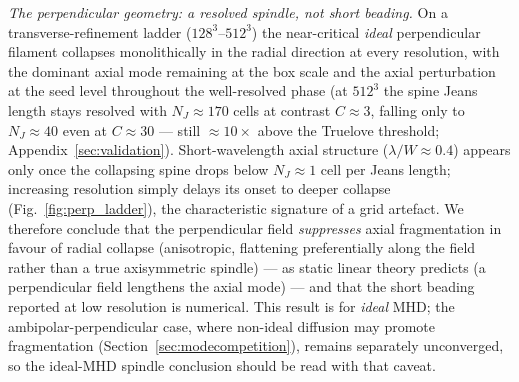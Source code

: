 \documentclass[usenatbib,twoside,twocolumn]{mnras}
\begin{document}
\emph{The perpendicular geometry: a resolved spindle, not short beading.} On a transverse-refinement ladder ($128^3$--$512^3$) the near-critical \emph{ideal} perpendicular filament collapses monolithically in the radial direction at every resolution, with the dominant axial mode remaining at the box scale and the axial perturbation at the seed level throughout the well-resolved phase (at $512^3$ the spine Jeans length stays resolved with $N_J\approx170$ cells at contrast $C\approx3$, falling only to $N_J\approx40$ even at $C\approx30$ --- still $\approx10\times$ above the Truelove threshold; Appendix~\ref{sec:validation}). Short-wavelength axial structure ($\lambda/W\approx0.4$) appears only once the collapsing spine drops below $N_J\approx1$ cell per Jeans length; increasing resolution simply delays its onset to deeper collapse (Fig.~\ref{fig:perp_ladder}), the characteristic signature of a grid artefact. We therefore conclude that the perpendicular field \emph{suppresses} axial fragmentation in favour of radial collapse (anisotropic, flattening preferentially along the field rather than a true axisymmetric spindle) --- as static linear theory predicts (a perpendicular field lengthens the axial mode) --- and that the short beading reported at low resolution is numerical. This result is for \emph{ideal} MHD; the ambipolar-perpendicular case, where non-ideal diffusion may promote fragmentation (Section~\ref{sec:modecompetition}), remains separately unconverged, so the ideal-MHD spindle conclusion should be read with that caveat.
\end{document}
